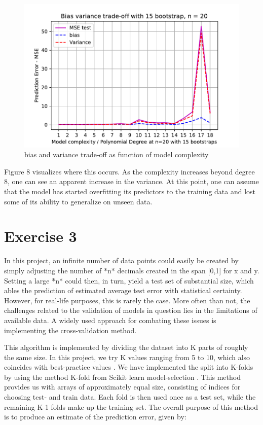 \documentclass[11pt, a4paper]{article}
\begin{document}
\begin{figure}[h]
  \centering
  \includegraphics[scale=0.75]{figures/EX2_model_complexity_using_bootstrap_function.pdf}
  \caption{\label{fig:?}bias and variance trade-off as function of model complexity}
\end{figure}

Figure 8 visualizes where this occurs. As the complexity increases beyond degree 8, one can see an apparent increase in the variance.  At this point, one can assume that the model has started overfitting its predictors to the training data and lost some of its ability to generalize on unseen data.


\section*{\label{ex:3}Exercise 3}
In this project, an infinite number of data points could easily be created by simply adjusting the number of *n* decimals created in the span [0,1] for x and y. Setting a large *n* could then, in turn, yield a test set of substantial size, which ables the prediction of estimated average test error with statistical certainty. However, for real-life purposes, this is rarely the case. More often than not, the challenges related to the validation of models in question lies in the limitations of available data.  A widely used approach for combating these issues is implementing the cross-validation method.

This algorithm is implemented by dividing the dataset into K parts of roughly the same size. In this project, we try K values ranging from 5 to 10, which also coincides with best-practice values \cite{Hastie2009}.  We have implemented the split into K-folds by using the method K-fold from Scikit learn model-selection \cite{link_to_doc}. This method provides us with arrays of approximately equal size, consisting of indices for choosing test- and train data.  Each fold is then used once as a test set, while the remaining K-1 folds make up the training set. The overall purpose of this method is to produce an estimate of the prediction error, given by:
\end{document}
